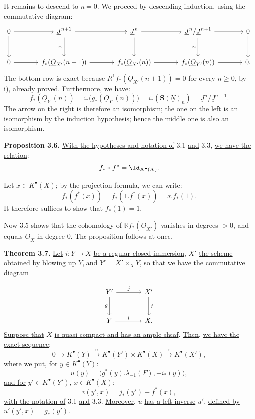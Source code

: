 It remains to descend to \(n=0\). We proceed by descending induction, using the commutative diagram:
\[
\begin{tikzcd}[column sep=large,row sep=large]
0 \arrow[r] \arrow[d] &
\underline{J}^{n+1} \arrow[r] \arrow[d,"\sim"'] &
\underline{J}^n \arrow[r] \arrow[d] &
\underline{J}^n/\underline{J}^{n+1} \arrow[r] \arrow[d,"\sim"'] &
0 \arrow[d]\\
0 \arrow[r] &
f_*(\underline{O}_{X'}(n+1)) \arrow[r] &
f_*(\underline{O}_{X'}(n)) \arrow[r] &
f_*(\underline{O}_{Y'}(n)) \arrow[r] &
0.
\end{tikzcd}
\]
The bottom row is exact because \(R^1f_*(\underline{O}_{X'}(n+1))=0\) for every \(n\ge0\), by i), already proved. Furthermore, we have:
\[
f_*(\underline{O}_{Y'}(n))
=i_*\bigl(g_*(\underline{O}_{Y'}(n))\bigr)
=i_*(\mathbf S(\underline{N})_n)
=\underline{J}^n/\underline{J}^{n+1}.
\]
The arrow on the right is therefore an isomorphism; the one on the left is an isomorphism by the induction hypothesis; hence the middle one is also an isomorphism.

\textbf{Proposition 3.6.} \uline{With the hypotheses and notation of} 3.1 \uline{and} 3.3, \uline{we have the relation}:
\[
f_*\circ f^*=\Id_{K^{\bullet}(X)}.
\]

Let \(x\in K^{\bullet}(X)\); by the projection formula, we can write:
\[
f_*(f^*(x))=f_*(1.f^*(x))=x.f_*(1).
\]
It therefore suffices to show that \(f_*(1)=1\).

Now 3.5 shows that the cohomology of \(\mathbb Rf_*(\underline{O}_{X'})\) vanishes in degrees \(>0\), and equals \(\underline{O}_X\) in degree \(0\). The proposition follows at once.

\textbf{Theorem 3.7.} \uline{Let} \(i:Y\to X\) \uline{be a regular closed immersion}, \(X'\) \uline{the scheme obtained by blowing up} \(Y\), \uline{and} \(Y'=X'\times_XY\), \uline{so that we have the commutative diagram}

%
\[
\begin{tikzcd}[column sep=large,row sep=large]
Y' \arrow[r,"j"] \arrow[d,"g"'] & X' \arrow[d,"f"]\\
Y \arrow[r,"i"] & X.
\end{tikzcd}
\]
\uline{Suppose that} \(X\) \uline{is quasi-compact and has an ample sheaf}. \uline{Then}, \uline{we have the exact sequence}:
\[
0\longrightarrow K^{\bullet}(Y)\xrightarrow{u}K^{\bullet}(Y')\times K^{\bullet}(X)
\xrightarrow{v}K^{\bullet}(X'),
\]
\uline{where we put}, \uline{for} \(y\in K^{\bullet}(Y)\):
\[
u(y)=\bigl(g^*(y).\lambda_{-1}(F),-i_*(y)\bigr),
\]
\uline{and for} \(y'\in K^{\bullet}(Y')\), \(x\in K^{\bullet}(X)\):
\[
v(y',x)=j_*(y')+f^*(x),
\]
\uline{with the notation of} 3.1 \uline{and} 3.3. \uline{Moreover}, \(u\) \uline{has a left inverse} \(u'\), \uline{defined by} \(u'(y',x)=g_*(y')\).

